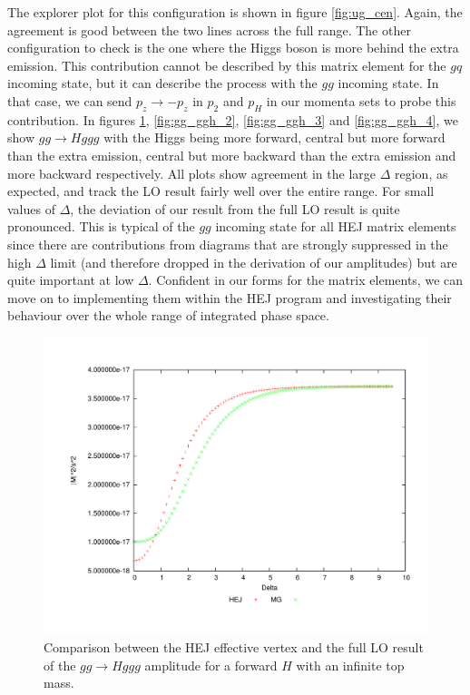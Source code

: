 The explorer plot for this configuration is shown in figure \ref{fig:ug_cen}. Again, the agreement is good between the two lines across the full range. The other configuration to check is the one where the Higgs boson is more behind the extra emission. This contribution cannot be described by this matrix element for the $gq$ incoming state, but it can describe the process with the $gg$ incoming state.  In that case, we can send $p_z \to -p_z$ in $p_2$ and $p_H$ in our momenta sets to probe this contribution. In figures \ref{fig:gg_ggh_1}, \ref{fig:gg_ggh_2}, \ref{fig:gg_ggh_3} and \ref{fig:gg_ggh_4}, we show $gg \to Hggg$ with the Higgs being more forward, central but more forward than the extra emission, central but more backward than the extra emission and more backward respectively. All plots show agreement in the large $\Delta$ region, as expected, and track the LO result fairly well over the entire range. For small values of $\Delta$, the deviation of our result from the full LO result is quite pronounced. This is typical of the $gg$ incoming state for all HEJ matrix elements \cite{Andersen2009a} since there are contributions from diagrams that are strongly suppressed in the high $\Delta$ limit (and therefore dropped in the derivation of our amplitudes) but are quite important at low $\Delta$. Confident in our forms for the matrix elements, we can move on to implementing them within the HEJ program and investigating their behaviour over the whole range of integrated phase space.

\begin{figure}[t]
\centering
\includegraphics[scale=0.45]{Images/gg_nextfor.pdf}
\caption{Comparison between the HEJ effective vertex and the full LO result of the $gg \to Hggg$ amplitude for a forward $H$ with an infinite top mass.}
\label{fig:gg_ggh_1}
\end{figure}

